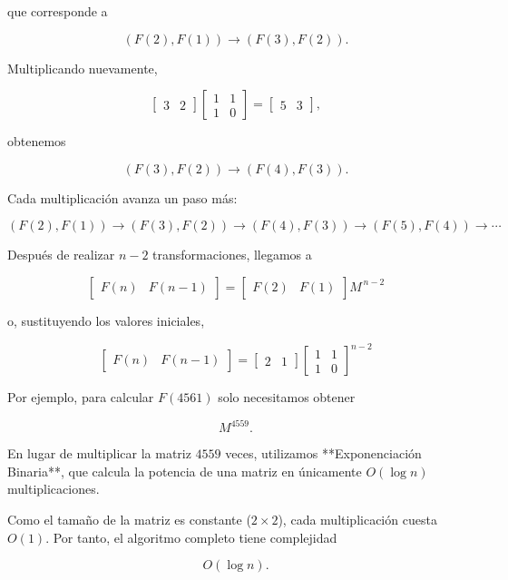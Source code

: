 que corresponde a

\[
(F(2),F(1))
\longrightarrow
(F(3),F(2)).
\]

Multiplicando nuevamente,

\[
\begin{bmatrix}
3 & 2
\end{bmatrix}
\begin{bmatrix}
1 & 1\\
1 & 0
\end{bmatrix}
=
\begin{bmatrix}
5 & 3
\end{bmatrix},
\]

obtenemos

\[
(F(3),F(2))
\longrightarrow
(F(4),F(3)).
\]

Cada multiplicación avanza un paso más:

\[
(F(2),F(1))
\rightarrow
(F(3),F(2))
\rightarrow
(F(4),F(3))
\rightarrow
(F(5),F(4))
\rightarrow
\cdots
\]

Después de realizar \(n-2\) transformaciones, llegamos a

\[
\boxed{
\begin{bmatrix}
F(n) & F(n-1)
\end{bmatrix}
=
\begin{bmatrix}
F(2) & F(1)
\end{bmatrix}
M^{\,n-2}
}
\]

o, sustituyendo los valores iniciales,

\[
\boxed{
\begin{bmatrix}
F(n) & F(n-1)
\end{bmatrix}
=
\begin{bmatrix}
2 & 1
\end{bmatrix}
\begin{bmatrix}
1 & 1\\
1 & 0
\end{bmatrix}^{n-2}
}
\]

Por ejemplo, para calcular \(F(4561)\) solo necesitamos obtener

\[
M^{4559}.
\]

En lugar de multiplicar la matriz \(4559\) veces, utilizamos **Exponenciación Binaria**, que calcula la potencia de una matriz en únicamente \(O(\log n)\) multiplicaciones.

Como el tamaño de la matriz es constante (\(2\times2\)), cada multiplicación cuesta \(O(1)\). Por tanto, el algoritmo completo tiene complejidad

\[
\boxed{O(\log n)}.
\]